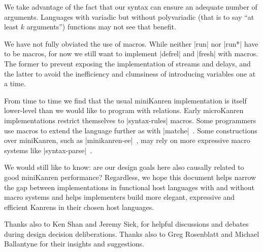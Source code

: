 \documentclass[sigplan,screen,draft,anonymous,review,natbib=false]{acmart}
\begin{document}
We take advantage of the fact that our syntax can ensure an
adequate number of arguments. Languages with variadic but without
polyvariadic (that is to say \enquote{at least $k$ arguments})
functions may not see that benefit.

We have not fully obviated the use of macros. While neither
\rackinline|run| nor \rackinline|run*| have to be macros, for now we
still want to implement \rackinline|defrel| and \rackinline|fresh|
with macros. The former to prevent exposing the implementation of
streams and delays, and the latter to avoid the inefficiency and
clumsiness of introducing variables one at a time.

From time to time we find that the usual miniKanren implementation is
itself lower-level than we would like to program with relations. Early
microKanren implementations restrict themselves to
\rackinline|syntax-rules| macros. Some programmers use macros to
extend the language further as with
\rackinline|matche|~\cite{keep2009pattern}. Some constructions over
miniKanren, such as
\rackinline|minikanren-ee|~\cite{ballantyne2020macros}, may rely on
more expressive macro systems like
\rackinline|syntax-parse|~\cite{culpepper2012fortifying}.

We would still like to know: are our design goals here also causally
related to good miniKanren performance? Regardless, we hope this
document helps narrow the gap between implementations in functional
host languages with and without macro systems and helps implementers
build more elegant, expressive and efficient Kanrens in their chosen
host languages.

\begin{acks}

  Thanks also to Ken Shan and Jeremy Siek, for helpful discussions and
  debates during design decision deliberations. Thanks also to Greg
  Rosenblatt and Michael Ballantyne for their insights and
  suggestions.

\end{acks}

\printbibliography{}
\end{document}
